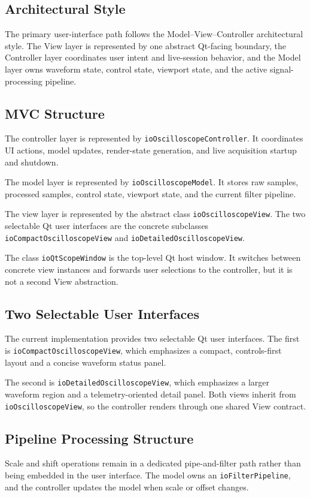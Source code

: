 \subsection{Architectural Style}
The primary user-interface path follows the Model--View--Controller architectural style. The View layer is represented by one abstract Qt-facing boundary, the Controller layer coordinates user intent and live-session behavior, and the Model layer owns waveform state, control state, viewport state, and the active signal-processing pipeline.

\subsection{MVC Structure}
The controller layer is represented by \texttt{ioOscilloscopeController}. It coordinates UI actions, model updates, render-state generation, and live acquisition startup and shutdown.

The model layer is represented by \texttt{ioOscilloscopeModel}. It stores raw samples, processed samples, control state, viewport state, and the current filter pipeline.

The view layer is represented by the abstract class \texttt{ioOscilloscopeView}. The two selectable Qt user interfaces are the concrete subclasses \texttt{ioCompactOscilloscopeView} and \texttt{ioDetailedOscilloscopeView}.

The class \texttt{ioQtScopeWindow} is the top-level Qt host window. It switches between concrete view instances and forwards user selections to the controller, but it is not a second View abstraction.

\subsection{Two Selectable User Interfaces}
The current implementation provides two selectable Qt user interfaces. The first is \texttt{ioCompactOscilloscopeView}, which emphasizes a compact, controls-first layout and a concise waveform status panel.

The second is \texttt{ioDetailedOscilloscopeView}, which emphasizes a larger waveform region and a telemetry-oriented detail panel. Both views inherit from \texttt{ioOscilloscopeView}, so the controller renders through one shared View contract.

\subsection{Pipeline Processing Structure}
Scale and shift operations remain in a dedicated pipe-and-filter path rather than being embedded in the user interface. The model owns an \texttt{ioFilterPipeline}, and the controller updates the model when scale or offset changes.


